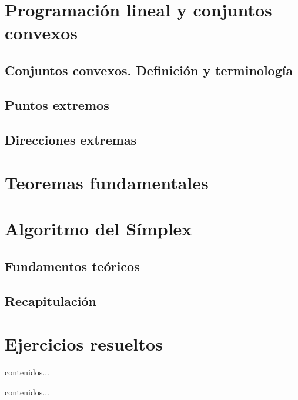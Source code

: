 \section{Programación lineal y conjuntos convexos}
\subsection{Conjuntos convexos. Definición y terminología}
\subsection{Puntos extremos}
\subsection{Direcciones extremas}
\section{Teoremas fundamentales}
\section{Algoritmo del Símplex}
\subsection{Fundamentos teóricos}
\subsection{Recapitulación}
\section{Ejercicios resueltos}
\begin{exerc}
	contenidos...
\end{exerc}
\begin{solu}
	contenidos...
\end{solu}